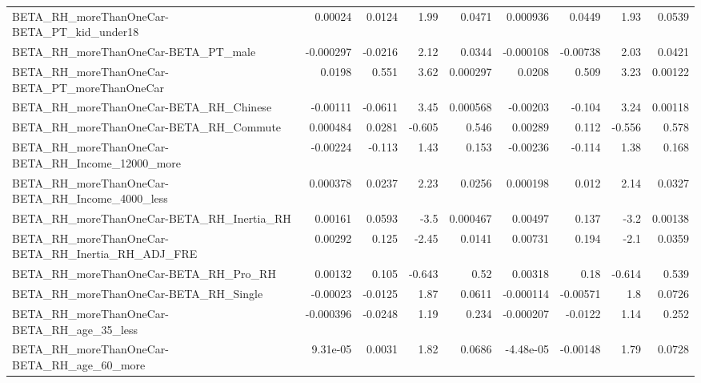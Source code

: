 \begin{tabular}{lrrrrrrrr}
BETA\_RH\_moreThanOneCar-BETA\_PT\_kid\_under18         &     0.00024 &       0.0124 &     1.99 &   0.0471 &   0.000936 &      0.0449 &         1.93 &        0.0539 \\
BETA\_RH\_moreThanOneCar-BETA\_PT\_male                &   -0.000297 &      -0.0216 &     2.12 &   0.0344 &  -0.000108 &    -0.00738 &         2.03 &        0.0421 \\
BETA\_RH\_moreThanOneCar-BETA\_PT\_moreThanOneCar      &      0.0198 &        0.551 &     3.62 & 0.000297 &     0.0208 &       0.509 &         3.23 &       0.00122 \\
BETA\_RH\_moreThanOneCar-BETA\_RH\_Chinese             &    -0.00111 &      -0.0611 &     3.45 & 0.000568 &   -0.00203 &      -0.104 &         3.24 &       0.00118 \\
BETA\_RH\_moreThanOneCar-BETA\_RH\_Commute             &    0.000484 &       0.0281 &   -0.605 &    0.546 &    0.00289 &       0.112 &       -0.556 &         0.578 \\
BETA\_RH\_moreThanOneCar-BETA\_RH\_Income\_12000\_more   &    -0.00224 &       -0.113 &     1.43 &    0.153 &   -0.00236 &      -0.114 &         1.38 &         0.168 \\
BETA\_RH\_moreThanOneCar-BETA\_RH\_Income\_4000\_less    &    0.000378 &       0.0237 &     2.23 &   0.0256 &   0.000198 &       0.012 &         2.14 &        0.0327 \\
BETA\_RH\_moreThanOneCar-BETA\_RH\_Inertia\_RH          &     0.00161 &       0.0593 &     -3.5 & 0.000467 &    0.00497 &       0.137 &         -3.2 &       0.00138 \\
BETA\_RH\_moreThanOneCar-BETA\_RH\_Inertia\_RH\_ADJ\_FRE  &     0.00292 &        0.125 &    -2.45 &   0.0141 &    0.00731 &       0.194 &         -2.1 &        0.0359 \\
BETA\_RH\_moreThanOneCar-BETA\_RH\_Pro\_RH              &     0.00132 &        0.105 &   -0.643 &     0.52 &    0.00318 &        0.18 &       -0.614 &         0.539 \\
BETA\_RH\_moreThanOneCar-BETA\_RH\_Single              &    -0.00023 &      -0.0125 &     1.87 &   0.0611 &  -0.000114 &    -0.00571 &          1.8 &        0.0726 \\
BETA\_RH\_moreThanOneCar-BETA\_RH\_age\_35\_less         &   -0.000396 &      -0.0248 &     1.19 &    0.234 &  -0.000207 &     -0.0122 &         1.14 &         0.252 \\
BETA\_RH\_moreThanOneCar-BETA\_RH\_age\_60\_more         &    9.31e-05 &       0.0031 &     1.82 &   0.0686 &  -4.48e-05 &    -0.00148 &         1.79 &        0.0728 \\

\end{tabular}
